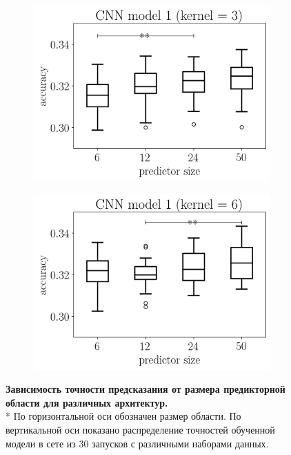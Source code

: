\begin{figure}[h]
\begin{subfigure}[]{0.48\linewidth}
		\includegraphics[width = \textwidth]{pics/cnn_model_1_all_runs_p1_ecoli_100000_10000_all_0.png}
		\label{fig:beta}
	\end{subfigure}
	\begin{subfigure}[]{0.48\linewidth}
		\includegraphics[width = \textwidth]{pics/cnn_model_2_all_runs_p1_ecoli_100000_10000_all_0.png}
		\label{fig:cnn_2_predictor}
	\end{subfigure}
	\caption{{\bfseries Зависимость точности предсказания от размера предикторной области для различных архитектур.} \\*
	По горизонтальной оси обозначен размер области. По вертикальной оси показано распределение точностей обученной модели в сете из 30 запусков с различными наборами данных.}
	
	\label{fig:size}
	
\end{figure}